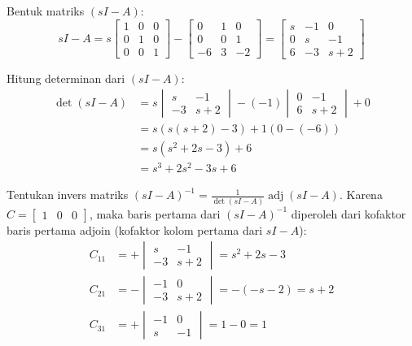 \documentclass[11pt,a4paper]{article}
\begin{document}
Bentuk matriks $(sI - A)$:
\begin{equation*}
    sI - A =
    s \begin{bmatrix} 1 & 0 & 0 \\ 0 & 1 & 0 \\ 0 & 0 & 1 \end{bmatrix}
    -
    \begin{bmatrix} 0 & 1 & 0 \\ 0 & 0 & 1 \\ -6 & 3 & -2 \end{bmatrix}
    =
    \begin{bmatrix}
        s & -1 & 0 \\
        0 & s & -1 \\
        6 & -3 & s + 2
    \end{bmatrix}
\end{equation*}

Hitung determinan dari $(sI - A)$:
\begin{align*}
    \det(sI - A) &= s \begin{vmatrix} s & -1 \\ -3 & s + 2 \end{vmatrix} - (-1)\begin{vmatrix} 0 & -1 \\ 6 & s + 2 \end{vmatrix} + 0 \\
    &= s(s(s + 2) - 3) + 1(0 - (-6)) \\
    &= s(s^2 + 2s - 3) + 6 \\
    &= s^3 + 2s^2 - 3s + 6
\end{align*}

Tentukan invers matriks $(sI - A)^{-1} = \frac{1}{\det(sI - A)}\operatorname{adj}(sI - A)$. Karena $C = \begin{bmatrix} 1 & 0 & 0 \end{bmatrix}$, maka baris pertama dari $(sI - A)^{-1}$ diperoleh dari kofaktor baris pertama adjoin (kofaktor kolom pertama dari $sI - A$):
\begin{align*}
    C_{11} &= + \begin{vmatrix} s & -1 \\ -3 & s + 2 \end{vmatrix} = s^2 + 2s - 3 \\
    C_{21} &= - \begin{vmatrix} -1 & 0 \\ -3 & s + 2 \end{vmatrix} = -(-s - 2) = s + 2 \\
    C_{31} &= + \begin{vmatrix} -1 & 0 \\ s & -1 \end{vmatrix} = 1 - 0 = 1
\end{align*}
\end{document}
